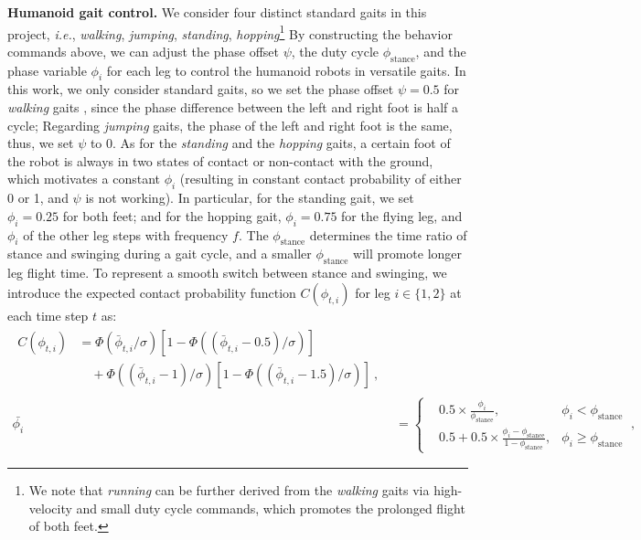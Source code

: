 \noindent\textbf{Humanoid gait control.} 
\label{Humanoid gait control}
We consider four distinct standard gaits in this project, \textit{i.e.}, \textit{walking}, \textit{jumping}, \textit{standing}, \textit{hopping}\footnote{We note that \textit{running} can be further derived from the \textit{walking} gaits via high-velocity and small duty cycle commands, which promotes the prolonged flight of both feet.}
By constructing the behavior commands above, we can adjust the phase offset $\psi$, the duty cycle $\phi_{\text{stance}}$, and the phase variable $\phi_i$ for each leg to control the humanoid robots in versatile gaits.
In this work, we only consider standard gaits, so we set the phase offset $\psi = 0.5$ for \textit{walking} gaits \cite{2021BipedalPeriodicReward}, since the phase difference between the left and right foot is half a cycle;
Regarding \textit{jumping} gaits, the phase of the left and right foot is the same, thus, we set $\psi$ to 0. 
As for the \textit{standing} and the \textit{hopping} gaits, a certain foot of the robot is always in two states of contact or non-contact with the ground, which motivates a constant $\phi_i$ (resulting in constant contact probability of either 0 or 1, and $\psi$ is not working). In particular, for the standing gait, we set $\phi_i=0.25$ for both feet; and for the hopping gait, $\phi_i=0.75$ for the flying leg, and $\phi_i$ of the other leg steps with frequency $f$.
The $\phi_{\text{stance}}$ determines the time ratio of stance and swinging during a gait cycle, and a smaller $\phi_{\text{stance}}$ will promote longer leg flight time. 
To represent a smooth switch between stance and swinging, 
we introduce the expected contact probability function $C(\phi_{t,i})$ for leg $i\in\{1,2\}$ at each time step $t$ as:
\begin{align}
\begin{split}
C(\phi_{t,i}) &= \Phi(\bar{\phi}_{t,i} / \sigma) [1 - \Phi((\bar{\phi}_{t,i} - 0.5)/\sigma)] \\
& \quad + \Phi((\bar{\phi}_{t,i}- 1)/\sigma) [1 - \Phi((\bar{\phi}_{t,i} - 1.5)/\sigma)]~,
\end{split}
\\
\bar{\phi_i} &= \left\{\begin{aligned}
&0.5 \times \frac{\phi_i}{\phi_\text{stance}}, 
&\phi_i < \phi_\text{stance} \\ 
& 0.5 + 0.5 \times \frac{\phi_i - \phi_\text{stance}}{1 - \phi_\text{stance}},   &\phi_i \ge \phi_{\text{stance}}
\end{aligned}\right.~,\label{eq:bar_phi}
\end{align}

